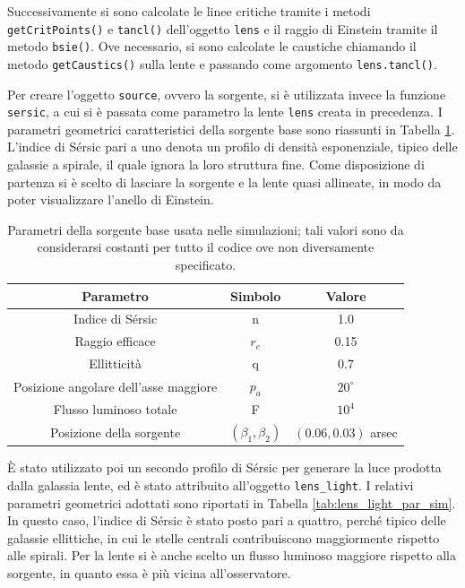 Successivamente si sono calcolate le linee critiche tramite i metodi \texttt{getCritPoints()} e \texttt{tancl()} dell'oggetto \texttt{lens} e il raggio di Einstein tramite il metodo \texttt{bsie()}.
Ove necessario, si sono calcolate le caustiche chiamando il metodo \texttt{getCaustics()} sulla lente e passando come argomento \texttt{lens.tancl()}. 

Per creare l'oggetto \texttt{source}, ovvero la sorgente, si è utilizzata invece la funzione \texttt{sersic}, a cui si è passata come parametro la lente \texttt{lens} creata in precedenza. I parametri geometrici caratteristici della sorgente base sono riassunti in Tabella \ref{tab:source_par_sim}. L'indice di Sérsic pari a uno denota un profilo di densità esponenziale, tipico delle galassie a spirale, il quale ignora la loro struttura fine. Come disposizione di partenza si è scelto di lasciare la sorgente e la lente quasi allineate, in modo da poter visualizzare l'anello di Einstein.

\begin{table}[]
\centering
\begin{tabular}{|c|c|c|}
\hline
\textbf{Parametro}                    & \textbf{Simbolo}     & \textbf{Valore} \\ \hline
Indice di Sérsic                      & n                    & 1.0             \\ \hline
Raggio efficace                       & $r_e$                & 0.15            \\ \hline
Ellitticità                           & q                    & 0.7             \\ \hline
Posizione angolare dell'asse maggiore & $p_a$                & $20^\circ$    \\ \hline
Flusso luminoso totale                & F                    & $10^4$          \\ \hline
Posizione della sorgente              & $(\beta_1, \beta_2)$ & $(0.06,0.03)$ arsec   \\ \hline
\end{tabular}
\caption{Parametri della sorgente base usata nelle simulazioni; tali valori sono da considerarsi costanti per tutto il codice ove non diversamente specificato.}
\label{tab:source_par_sim}
\end{table}

È stato utilizzato poi un secondo profilo di Sérsic per generare la luce prodotta dalla galassia lente, ed è stato attribuito all'oggetto \texttt{lens\_light}. I relativi parametri geometrici adottati sono riportati in Tabella \ref{tab:lens_light_par_sim}.
In questo caso, l'indice di Sérsic è stato posto pari a quattro, perché tipico delle galassie ellittiche, in cui le stelle centrali contribuiscono maggiormente rispetto alle spirali. Per la lente si è anche scelto un flusso luminoso maggiore rispetto alla sorgente, in quanto essa è più vicina all'osservatore.

